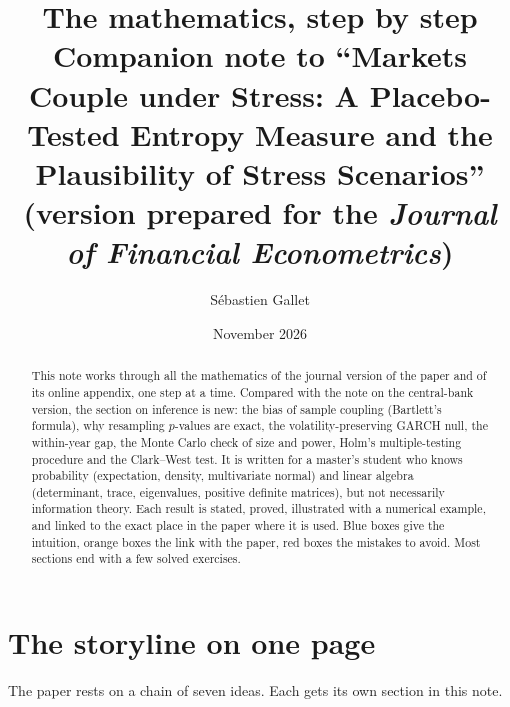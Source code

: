 \documentclass[11pt]{article}
\title{The mathematics, step by step\\[4pt]
\large Companion note to ``Markets Couple under Stress: A Placebo-Tested Entropy
Measure and the Plausibility of Stress Scenarios''\\[2pt]
\normalsize (version prepared for the \emph{Journal of Financial Econometrics})}
\author{Sébastien Gallet}
\date{November 2026}
\theoremstyle{plain}
\theoremstyle{definition}
\theoremstyle{remark}
\begin{document}
\maketitle

\begin{abstract}
\noindent This note works through all the mathematics of the journal version
of the paper and of its online appendix, one step at a time. Compared with the
note on the central-bank version, the section on inference is new: the bias of
sample coupling (Bartlett's formula), why resampling $p$-values are exact, the
volatility-preserving GARCH null, the within-year gap, the Monte Carlo check
of size and power, Holm's multiple-testing procedure and the Clark--West test. It is written for a master's
student who knows probability (expectation, density, multivariate normal) and
linear algebra (determinant, trace, eigenvalues, positive definite matrices),
but not necessarily information theory. Each result is stated, proved,
illustrated with a numerical example, and linked to the exact place in the
paper where it is used. Blue boxes give the intuition, orange boxes the link
with the paper, red boxes the mistakes to avoid. Most sections end with a few
solved exercises.
\end{abstract}

\tableofcontents

\section*{The storyline on one page}

The paper rests on a chain of seven ideas. Each gets its own section in this
note.
\end{document}
